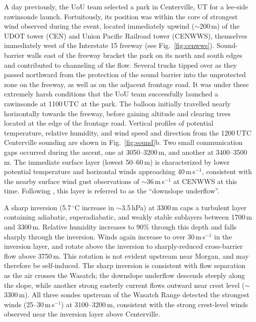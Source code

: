 \documentclass[pdftex,12pt]{article}
\def\mps{m\,s$^{-1}$}
\def\degC{$^{\circ}$C} %
\def\around{$\sim$}
\begin{document}
A day previously, the UoU team selected a park in Centerville, UT for a lee-side rawinsonde launch. Fortuitously, its position was within the core of strongest wind observed during the event, located immediately upwind (\around 200\,m) of the UDOT tower (CEN) and Union Pacific Railroad tower (CENWWS), themselves immediately west of the Interstate 15 freeway (see Fig.~\ref{fig:cenwws}). Sound-barrier walls east of the freeway bracket the park on its north and south edges and contributed to channeling of the flow. Several trucks tipped over as they passed northward from the protection of the sound barrier into the unprotected zone on the freeway, as well as on the adjacent frontage road. It was under these extremely harsh conditions that the UoU team successfully launched a rawinsonde at 1100\,UTC at the park. The balloon initially travelled nearly horizontally towards the freeway, before gaining altitude and clearing trees located at the edge of the frontage road. Vertical profiles of potential temperature, relative humidity, and wind speed and direction from the 1200\,UTC Centerville sounding are shown in Fig.~\ref{fig:sound}b. Two small communication gaps occurred during the ascent, one at 3050--3200\,m, and another at 3400--3500\,m. The immediate surface layer (lowest 50--60\,m) is characterized by lower potential temperature and horizontal winds approaching 40\,\mps, consistent with the nearby surface wind gust observations of \around 36\,\mps{} at CENWWS at this time. Following \citet{Armi2011}, this layer is referred to as the ``downslope underflow''.

A sharp inversion (5.7\,\degC{} increase in \around 3.5\,hPa) at 3300\,m caps a turbulent layer containing adiabatic, superadiabatic, and weakly stable sublayers between 1700\,m and 3300\,m. Relative humidity increases to 90\% through this depth and falls sharply through the inversion. Winds again increase to over 30\,\mps{} in the inversion layer, and rotate above the inversion to sharply-reduced cross-barrier flow above 3750\,m. This rotation is not evident upstream near Morgan, and may therefore be self-induced. The sharp inversion is consistent with flow separation as the air crosses the Wasatch; the downslope underflow descends steeply along the slope, while another strong easterly current flows outward near crest level (\around 3300\,m). All three sondes upstream of the Wasatch Range detected the strongest winds (25--30\,\mps) at 3100--3200\,m, consistent with the strong crest-level winds observed near the inversion layer above Centerville.
\end{document}
